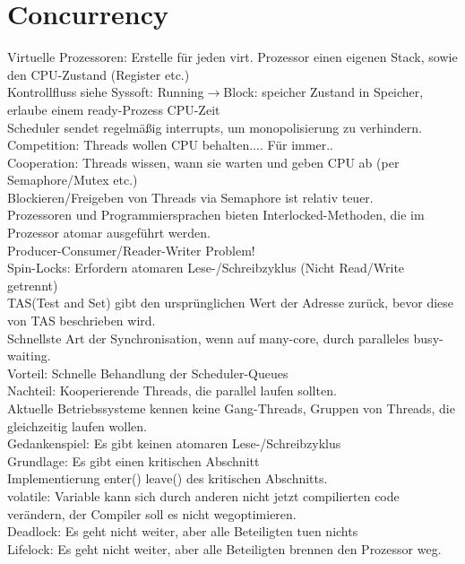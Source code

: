 \documentclass[a4paper]{article}
\begin{document}
\section{Concurrency}
Virtuelle Prozessoren: Erstelle für jeden virt. Prozessor einen eigenen Stack, sowie den CPU-Zustand (Register etc.)\\
Kontrollfluss siehe Syssoft: Running$\rightarrow$Block: speicher Zustand in Speicher, erlaube einem ready-Prozess CPU-Zeit\\
Scheduler sendet regelmäßig interrupts, um monopolisierung zu verhindern.\\
Competition: Threads wollen CPU behalten.... Für immer..\\
Cooperation: Threads wissen, wann sie warten und geben CPU ab (per Semaphore/Mutex etc.)\\
Blockieren/Freigeben von Threads via Semaphore ist relativ teuer.\\
Prozessoren und Programmiersprachen bieten Interlocked-Methoden, die im Prozessor atomar ausgeführt werden.\\
Producer-Consumer/Reader-Writer Problem!\\
Spin-Locks: Erfordern atomaren Lese-/Schreibzyklus (Nicht Read/Write getrennt)\\
TAS(Test and Set) gibt den ursprünglichen Wert der Adresse zurück, bevor diese von TAS beschrieben wird.\\
Schnellste Art der Synchronisation, wenn auf many-core, durch paralleles busy-waiting.\\
Vorteil: Schnelle Behandlung der Scheduler-Queues\\
Nachteil: Kooperierende Threads, die parallel laufen sollten.\\
Aktuelle Betriebssysteme kennen keine Gang-Threads, Gruppen von Threads, die gleichzeitig laufen wollen.\\
Gedankenspiel: Es gibt keinen atomaren Lese-/Schreibzyklus\\
Grundlage: Es gibt einen kritischen Abschnitt\\
Implementierung enter() leave() des kritischen Abschnitts.\\
volatile: Variable kann sich durch anderen nicht jetzt compilierten code verändern, der Compiler soll es nicht wegoptimieren.\\
Deadlock: Es geht nicht weiter, aber alle Beteiligten tuen nichts\\
Lifelock: Es geht nicht weiter, aber alle Beteiligten brennen den Prozessor weg.
\end{document}
